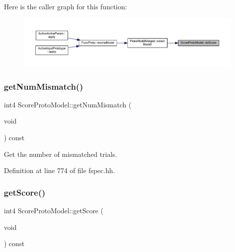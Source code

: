 Here is the caller graph for this function\+:
\nopagebreak
\begin{figure}[H]
\begin{center}
\leavevmode
\includegraphics[width=350pt]{class_score_proto_model_aae328b10f50c1f6526f503e0064d4749_icgraph}
\end{center}
\end{figure}
\mbox{\label{class_score_proto_model_aeb55589e04d1f68f9bd2d2eebb4a5710}} 
\subsubsection{\texorpdfstring{getNumMismatch()}{getNumMismatch()}}
{\footnotesize\ttfamily int4 Score\+Proto\+Model\+::get\+Num\+Mismatch (\begin{DoxyParamCaption}\item[{void}]{ }\end{DoxyParamCaption}) const\hspace{0.3cm}{\ttfamily [inline]}}



Get the number of mismatched trials. 



Definition at line 774 of file fspec.\+hh.

\mbox{\label{class_score_proto_model_a3dec47bf8f824704151759848f50ddc7}} 
\subsubsection{\texorpdfstring{getScore()}{getScore()}}
{\footnotesize\ttfamily int4 Score\+Proto\+Model\+::get\+Score (\begin{DoxyParamCaption}\item[{void}]{ }\end{DoxyParamCaption}) const\hspace{0.3cm}{\ttfamily [inline]}}




